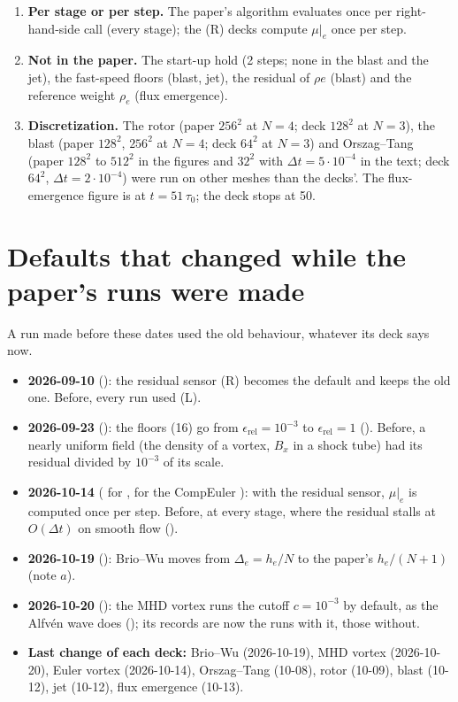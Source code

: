 \documentclass[10pt]{article}
\newcommand{\erel}{\epsilon_{\mathrm{rel}}}
\begin{document}
\begin{enumerate}[leftmargin=*]
\item \textbf{Per stage or per step.} The paper's algorithm evaluates \dsgs{} once per right-hand-side call (every stage); the
(R) decks compute $\mu|_e$ once per step.
\item \textbf{Not in the paper.} The start-up hold (2 steps; none in the blast and the jet), the fast-speed floors (blast, jet),
the residual of $\rho e$ (blast) and the reference weight $\rho_e$ (flux emergence).
\item \textbf{Discretization.} The rotor (paper $256^2$ at $N=4$; deck $128^2$ at $N=3$), the blast (paper $128^2$, $256^2$ at
$N=4$; deck $64^2$ at $N=3$) and Orszag--Tang (paper $128^2$ to $512^2$ in the figures and $32^2$ with $\Delta t=5\cdot10^{-4}$ in
the text; deck $64^2$, $\Delta t=2\cdot10^{-4}$) were run on other meshes than the decks'. The flux-emergence figure is at
$t=51\,\tau_0$; the deck stops at 50.
\end{enumerate}

\section*{Defaults that changed while the paper's runs were made}
A run made before these dates used the old behaviour, whatever its deck says now.
\begin{itemize}[leftmargin=*]
\item \textbf{2026-09-10} (): the residual sensor (R) becomes the default and 
keeps the old one. Before, every \dsgs{} run used (L).
\item \textbf{2026-09-23} (): the floors (16) go from $\erel=10^{-3}$ to $\erel=1$ (). Before,
a nearly uniform field (the density of a vortex, $B_x$ in a shock tube) had its residual divided by $10^{-3}$ of its scale.
\item \textbf{2026-10-14} ( for ,  for the CompEuler ): with the residual
sensor, $\mu|_e$ is computed once per step. Before, at every stage, where the residual stalls at $O(\Delta t)$ on smooth flow
().
\item \textbf{2026-10-19} (): Brio--Wu moves from $\Delta_e=h_e/N$ to the paper's $h_e/(N+1)$ (note $a$).
\item \textbf{2026-10-20} (): the MHD vortex runs the cutoff $c=10^{-3}$ by default, as the Alfv\'en wave does
(); its records  are now the runs with it,  those without.
\item \textbf{Last change of each deck:} Brio--Wu  (2026-10-19), MHD vortex  (2026-10-20), Euler vortex 
(2026-10-14), Orszag--Tang  (10-08), rotor  (10-09), blast  (10-12), jet
 (10-12), flux emergence  (10-13).
\end{itemize}
\end{document}
